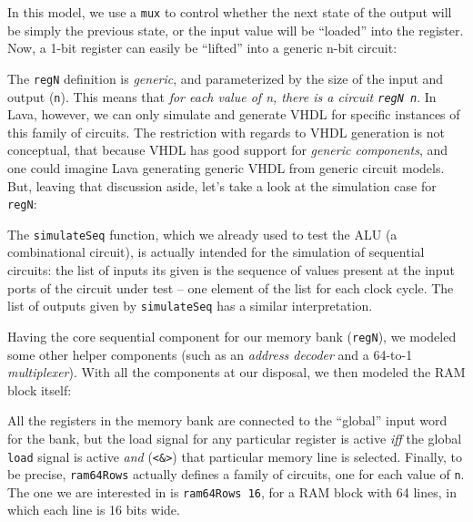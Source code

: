 \documentclass[a4paper]{article}
\begin{document}
                In this model, we use a \texttt{mux} to control whether the next state of the output
                will be simply the previous state, or the input value will be ``loaded'' into the
                register. Now, a 1-bit register can easily be ``lifted'' into a generic n-bit
                circuit:

                The \texttt{regN} definition is \emph{generic}, and parameterized by the size of the
                input and output (\texttt{n}). This means that \emph{for each value of n, there is a
                    circuit \texttt{regN n}}. In Lava, however, we can only simulate and generate
                VHDL for specific instances of this family of circuits. The restriction with regards
                to VHDL generation is not conceptual, that because VHDL has good support for
                \emph{generic components}, and one could imagine Lava generating generic VHDL from
                generic circuit models. But, leaving that discussion aside, let's take a look at the
                simulation case for \texttt{regN}:

                The \texttt{simulateSeq} function, which we already used to test the ALU (a
                combinational circuit), is actually intended for the simulation of sequential
                circuits: the list of inputs its given is the sequence of values present at the
                input ports of the circuit under test -- one element of the list for each clock
                cycle. The list of outputs given by \texttt{simulateSeq} has a similar
                interpretation.

                Having the core sequential component for our memory bank (\texttt{regN}), we modeled
                some other helper components (such as an \emph{address decoder} and a 64-to-1
                \emph{multiplexer}). With all the components at our disposal, we then modeled the
                RAM block itself:

                All the registers in the memory bank are connected to the ``global'' input word for
                the bank, but the load signal for any particular register is active \emph{iff} the
                global \texttt{load} signal is active \emph{and} (\texttt{<\&>}) that particular
                memory line is selected. Finally, to be precise, \texttt{ram64Rows} actually defines
                a family of circuits, one for each value of \texttt{n}. The one we are interested in
                is \texttt{ram64Rows 16}, for a RAM block with 64 lines, in which each line is 16
                bits wide.
\end{document}

